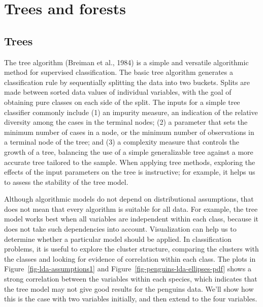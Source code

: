 \documentclass[
  letterpaper,
]{krantz}
\begin{document}
\chapter{Trees and forests}\label{sec-trees-forests}

\section{Trees}\label{sec-trees}


The tree algorithm (Breiman et al., 1984) is a simple and versatile
algorithmic method for supervised classification. The basic tree
algorithm generates a classification rule by sequentially splitting the
data into two buckets. Splits are made between sorted data values of
individual variables, with the goal of obtaining pure classes on each
side of the split. The inputs for a simple tree classifier commonly
include (1) an impurity measure, an indication of the relative diversity
among the cases in the terminal nodes; (2) a parameter that sets the
minimum number of cases in a node, or the minimum number of observations
in a terminal node of the tree; and (3) a complexity measure that
controls the growth of a tree, balancing the use of a simple
generalizable tree against a more accurate tree tailored to the sample.
When applying tree methods, exploring the effects of the input
parameters on the tree is instructive; for example, it helps us to
assess the stability of the tree model.

Although algorithmic models do not depend on distributional assumptions,
that does not mean that every algorithm is suitable for all data. For
example, the tree model works best when all variables are independent
within each class, because it does not take such dependencies into
account. Visualization can help us to determine whether a particular
model should be applied. In classification problems, it is useful to
explore the cluster structure, comparing the clusters with the classes
and looking for evidence of correlation within each class. The plots in
Figure~\ref{fig-lda-assumptions1} and
Figure~\ref{fig-penguins-lda-ellipses-pdf} shows a strong correlation
between the variables within each species, which indicates that the tree
model may not give good results for the penguins data. We'll show how
this is the case with two variables initially, and then extend to the
four variables.

 
 
\end{document}
